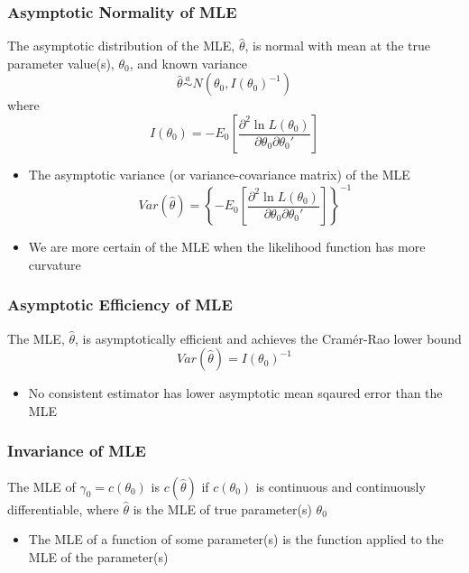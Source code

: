 \documentclass{beamer}
\begin{document}
\begin{frame}\frametitle{Asymptotic Normality of MLE}
    The asymptotic distribution of the MLE, $\hat{\theta}$, is normal with mean at the true parameter value(s), $\theta_0$, and known variance
    $$\hat{\theta} \overset{a}{\sim} N(\theta_0, I(\theta_0)^{-1})$$
    where
    $$I(\theta_0) = -E_0 \left[ \frac{\partial^2 \ln L(\theta_0)}{\partial \theta_0 \partial \theta_0'} \right]$$
    \begin{itemize}
        \item The asymptotic variance (or variance-covariance matrix) of the MLE
        $$Var(\hat{\theta}) = \left\{ -E_0 \left[ \frac{\partial^2 \ln L(\theta_0)}{\partial \theta_0 \partial \theta_0'} \right] \right\}^{-1}$$
        \item We are more certain of the MLE when the likelihood function has more curvature
    \end{itemize}
\end{frame}

\begin{frame}\frametitle{Asymptotic Efficiency of MLE}
    The MLE, $\hat{\theta}$, is asymptotically efficient and achieves the Cram\'er-Rao lower bound
    $$Var(\hat{\theta}) = I(\theta_0)^{-1}$$
    \begin{itemize}
        \item No consistent estimator has lower asymptotic mean sqaured error than the MLE
    \end{itemize}
\end{frame}

\begin{frame}\frametitle{Invariance of MLE}
    The MLE of $\gamma_0 = c(\theta_0)$ is $c(\hat{\theta})$ if $c(\theta_0)$ is continuous and continuously differentiable, where $\hat{\theta}$ is the MLE of true parameter(s) $\theta_0$
    \begin{itemize}
        \item The MLE of a function of some parameter(s) is the function applied to the MLE of the parameter(s)
    \end{itemize}
\end{frame}
\end{document}
